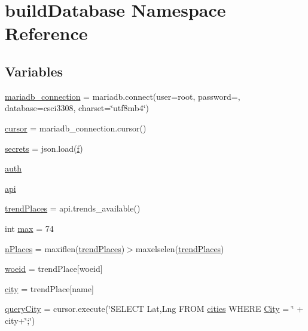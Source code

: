 \hypertarget{namespacebuildDatabase}{}\section{build\+Database Namespace Reference}
\label{namespacebuildDatabase}
\subsection*{Variables}
\begin{DoxyCompactItemize}
\item 
\hyperlink{namespacebuildDatabase_aeed13a096d6a186e5884c1465f8a703d}{mariadb\+\_\+connection} = mariadb.\+connect(user=\textquotesingle{}root\textquotesingle{}, password=\textquotesingle{}\textquotesingle{}, database=\textquotesingle{}csci3308\textquotesingle{}, charset=\char`\"{}utf8mb4\char`\"{})
\item 
\hyperlink{namespacebuildDatabase_ad7b3e488c85e92658c04ac329ded4206}{cursor} = mariadb\+\_\+connection.\+cursor()
\item 
\hyperlink{namespacebuildDatabase_af03183a3a08635357da39ffff3fa0c14}{secrets} = json.\+load(\hyperlink{jquery-3_8js_a9cf09a2972472098a4c689fd988f4dfc}{f})
\item 
\hyperlink{namespacebuildDatabase_ac63477d68e612f77cdca1d1adcc677da}{auth}
\item 
\hyperlink{namespacebuildDatabase_acfedb69db26209f1c7555bd335a70860}{api}
\item 
\hyperlink{namespacebuildDatabase_a0233021004fd1bc913cd8e1c81f51bdd}{trend\+Places} = api.\+trends\+\_\+available()
\item 
int \hyperlink{namespacebuildDatabase_a4ef5ab993f0509faafc01ab906cf576b}{max} = 74
\item 
\hyperlink{namespacebuildDatabase_a40723c8a3a2ff51719f1a5812af49ae2}{n\+Places} = maxiflen(\hyperlink{namespacebuildDatabase_a0233021004fd1bc913cd8e1c81f51bdd}{trend\+Places})$>$maxelselen(\hyperlink{namespacebuildDatabase_a0233021004fd1bc913cd8e1c81f51bdd}{trend\+Places})
\item 
\hyperlink{namespacebuildDatabase_ada15f1ae1b075d6b5385c60ad0bcba7e}{woeid} = trend\+Place\mbox{[}\textquotesingle{}woeid\textquotesingle{}\mbox{]}
\item 
\hyperlink{namespacebuildDatabase_a2d66916cea7965a5f65dd98ef44dd261}{city} = trend\+Place\mbox{[}\textquotesingle{}name\textquotesingle{}\mbox{]}
\item 
\hyperlink{namespacebuildDatabase_a0d6b3715d584e19547cb25cd7f0f4d28}{query\+City} = cursor.\+execute(\char`\"{}S\+E\+L\+E\+CT Lat,Lng F\+R\+OM \hyperlink{initMapScript_8js_a76167830814420bde81accf9e460aa96}{cities} W\+H\+E\+RE \hyperlink{classCity}{City} = \textquotesingle{}\char`\"{} + city+\char`\"{}\textquotesingle{};\char`\"{})

\end{DoxyCompactItemize}
